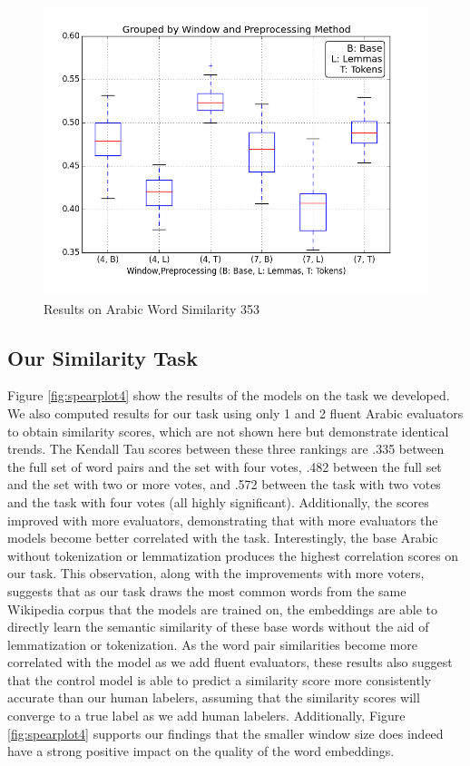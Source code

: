 \begin{figure}
  \includegraphics[width=\linewidth]{results_spearman/ar_similiarity_task_results_ws353_spearplot.png}
  \caption{Results on Arabic Word Similarity 353}
  \label{fig:spearplotws353}
\end{figure}

\subsection{Our Similarity Task}

Figure \ref{fig:spearplot4} show the results of the models on the task we developed. We also computed results for our task using only 1 and 2 fluent Arabic evaluators to obtain similarity scores, which are not shown here but demonstrate identical trends. The Kendall Tau scores between these three rankings are .335 between the full set of word pairs and the set with four votes, .482 between the full set and the set with two or more votes, and .572 between the task with two votes and the task with four votes (all highly significant). Additionally, the scores improved with more evaluators, demonstrating that with more evaluators the models become better correlated with the task. Interestingly, the base Arabic without tokenization or lemmatization produces the highest correlation scores on our task. This observation, along with the improvements with more voters, suggests that as our task draws the most common words from the same Wikipedia corpus that the models are trained on, the embeddings are able to directly learn the semantic similarity of these base words without the aid of lemmatization or tokenization. As the word pair similarities become more correlated with the model as we add fluent evaluators, these results also suggest that the control model is able to predict a similarity score more consistently accurate than our human labelers, assuming that the similarity scores will converge to a true label as we add human labelers. Additionally, Figure \ref{fig:spearplot4} supports our findings that the smaller window size does indeed have a strong positive impact on the quality of the word embeddings.

